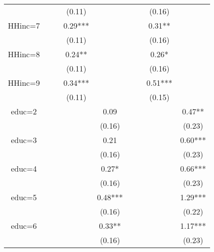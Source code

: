 \begin{table}[ht]
\begin{adjustbox}{width={0.9\textwidth},totalheight={\textheight}}
\begin{threeparttable}
\begin{tabular}{ccccccccc}
             &           &           &     (0.11) &             &           &            &      (0.16) &              \\
HHinc=7      &           &           &    0.29*** &             &           &            &      0.31** &              \\
             &           &           &     (0.11) &             &           &            &      (0.16) &              \\
HHinc=8      &           &           &     0.24** &             &           &            &       0.26* &              \\
             &           &           &     (0.11) &             &           &            &      (0.16) &              \\
HHinc=9      &           &           &    0.34*** &             &           &            &     0.51*** &              \\
             &           &           &     (0.11) &             &           &            &      (0.15) &              \\
educ=2       &           &           &            &        0.09 &           &            &             &       0.47** \\
             &           &           &            &      (0.16) &           &            &             &       (0.23) \\
educ=3       &           &           &            &        0.21 &           &            &             &      0.60*** \\
             &           &           &            &      (0.16) &           &            &             &       (0.23) \\
educ=4       &           &           &            &       0.27* &           &            &             &      0.66*** \\
             &           &           &            &      (0.16) &           &            &             &       (0.23) \\
educ=5       &           &           &            &     0.48*** &           &            &             &      1.29*** \\
             &           &           &            &      (0.16) &           &            &             &       (0.22) \\
educ=6       &           &           &            &      0.33** &           &            &             &      1.17*** \\
             &           &           &            &      (0.16) &           &            &             &       (0.23) \\

\end{tabular}
\end{threeparttable}
\end{adjustbox}
\end{table}
